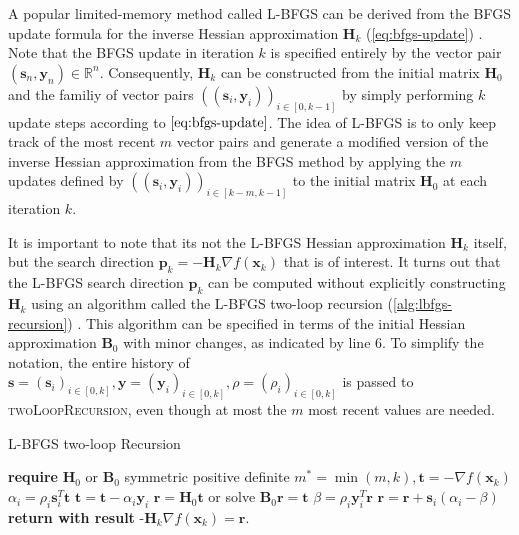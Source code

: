A popular limited-memory method called L-BFGS can be derived from the BFGS update formula for the inverse Hessian approximation 
$\bm{H}_k$ (\cref{eq:bfgs-update}) \cite{nocedal2006}. Note that the BFGS update in iteration $k$ is specified entirely 
by the vector 
pair $(\bm{s}_n, \bm{y}_n) \in \mathbb{R}^n$. Consequently, $\bm{H}_k$ can be constructed from the initial matrix $\bm{H}_0$ and the familiy 
of vector pairs $((\bm{s}_i, \bm{y}_i))_{i \in [0, k-1]}$ by simply performing $k$ update steps according to $\cref{eq:bfgs-update}$.
The idea of L-BFGS is to only keep track of the most recent $m$ vector pairs and generate a modified version of the inverse Hessian 
approximation from the BFGS method by applying the $m$ updates defined by $((\bm{s}_i, \bm{y}_i))_{i \in [k-m, k-1]}$ to the 
initial matrix $\bm{H}_0$ at each iteration $k$.

It is important to note that its not the L-BFGS Hessian approximation $\bm{H}_k$ itself, but the search direction $\bm{p}_k = -\bm{H}_k 
\nabla f(\bm{x}_k)$ that is of interest. It turns out that the L-BFGS search direction $\bm{p}_k$ can be computed without explicitly 
constructing $\bm{H}_k$ using an algorithm called the L-BFGS two-loop recursion (\cref{alg:lbfgs-recursion}) \cite{nocedal2006}. This
algorithm can be specified in terms of the initial Hessian approximation $\bm{B}_0$ with minor changes, as indicated by line 6. To 
simplify the notation, the entire history of $\bm{s} = (\bm{s}_i)_{i \in [0, k]}, \bm{y} = (\bm{y}_i)_{i \in [0, k]}, \rho = 
(\rho_i)_{i \in [0, k]}$
is passed to \textsc{twoLoopRecursion}, even though at most the $m$ most recent values are needed.

\begin{algorithm}
\caption{L-BFGS two-loop Recursion}\label{alg:lbfgs-recursion}
\begin{algorithmic}[1]
\State \textbf{require } $\bm{H}_0$ or $\bm{B}_0$ symmetric positive definite
\State $m^* = \min(m, k), \bm{t} = -\nabla f(\bm{x}_k)$
\State $\alpha_i = \rho_i \bm{s}^T_i \bm{t}$
\State $\bm{t} = \bm{t} - \alpha_i \bm{y}_i$
\EndFor
\State $\bm{r} = \bm{H}_0 \bm{t}$ or solve $\bm{B}_0 \bm{r} = \bm{t}$
\State $\beta = \rho_i \bm{y}^T_i \bm{r}$
\State $\bm{r} = \bm{r} + \bm{s}_i(\alpha_i - \beta)$
\EndFor
\State \textbf{return with result } -$\bm{H}_k \nabla f(\bm{x}_k) = \bm{r}$.
\EndProcedure
\end{algorithmic}
\end{algorithm}


